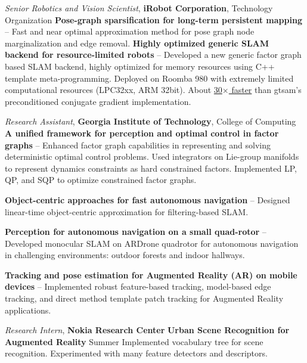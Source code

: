 \documentclass[letterpaper,MMMyyyy,nonstopmode]{simpleresumecv}
\begin{document}
\begin{Body}
\BigGap
\Entry
{\textit{Senior Robotics and Vision Scientist}, \textbf{iRobot Corporation}, Technology Organization}
\Gap
\BulletItem
\textbf{Pose-graph sparsification for long-term persistent mapping}
\hfill
{} -- 
\SubBulletItem
Fast and near optimal approximation method for pose graph node marginalization and edge removal.
\Gap
\BulletItem
\textbf{Highly optimized generic SLAM backend for resource-limited robots}
\hfill
{} -- 
\SubBulletItem
Developed a new generic factor graph based SLAM backend, highly optimized for memory resources using C++ template meta-programming.
\SubBulletItem
Deployed on Roomba 980 with extremely limited computational resources (LPC32xx, ARM 32bit).
\SubBulletItem
About \underline{30$\times$ faster} than gtsam's preconditioned conjugate gradient implementation.

\BigGap
\Entry
{\textit{Research Assistant}, \textbf{Georgia Institute of Technology}, College of Computing}
\Gap
\BulletItem
\textbf{A unified framework for perception and optimal control in factor graphs}
\hfill
{} -- 
\SubBulletItem
Enhanced factor graph capabilities in representing and solving deterministic optimal control problems.
\SubBulletItem
Used integrators on Lie-group manifolds to represent dynamics constraints as hard constrained factors.
\SubBulletItem
Implemented LP, QP, and SQP to optimize constrained factor graphs.

\Gap
{}
\BulletItem
\textbf{Object-centric approaches for fast autonomous navigation}
\hfill
{} -- 
\SubBulletItem
Designed linear-time object-centric approximation for filtering-based SLAM.

\Gap
\BulletItem
\textbf{Perception for autonomous navigation on a small quad-rotor}
\hfill
{} -- 
\SubBulletItem
Developed monocular SLAM on ARDrone quadrotor for autonomous navigation in challenging environments: outdoor forests and indoor hallways.

\Gap
\BulletItem
\textbf{Tracking and pose estimation for Augmented Reality (AR) on mobile devices}
\hfill
{} -- 
\SubBulletItem
Implemented robust feature-based tracking, model-based edge tracking, and direct method template patch tracking for Augmented Reality applications.

\BigGap
\Entry
{\textit{Research Intern}, \textbf{Nokia Research Center}}
\Gap
\BulletItem
\textbf{Urban Scene Recognition for Augmented Reality}
\hfill
Summer 
\SubBulletItem
Implemented vocabulary tree for scene recognition.
\SubBulletItem
Experimented with many feature detectors and descriptors.


\end{Body}
\end{document}
